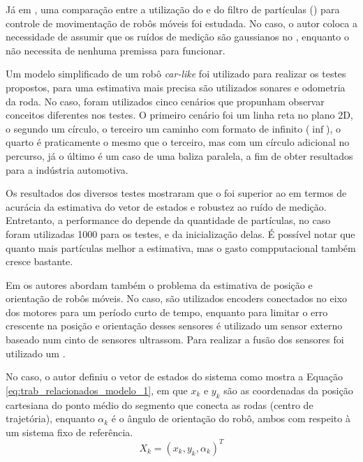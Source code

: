 \documentclass[acronym, symbols]{fei}
\begin{document}
	Já em \cite{rigatos2010extended}, uma comparação entre a utilização do  e do filtro de partículas () para controle de movimentação de robôs móveis foi estudada. No caso, o autor coloca a necessidade de assumir que os ruídos de medição são gaussianos no , enquanto o  não necessita de nenhuma premissa para funcionar.
	
	Um modelo simplificado de um robô \textit{car-like} foi utilizado para realizar os testes propostos, para uma estimativa mais precisa são utilizados sonares e odometria da roda. No caso, foram utilizados cinco cenários que propunham observar conceitos diferentes nos testes. O primeiro cenário foi um linha reta no plano 2D, o segundo um círculo, o terceiro um caminho com formato de infinito ($\inf$), o quarto é praticamente o mesmo que o terceiro, mas com um círculo adicional no percurso, já o último é um caso de uma baliza paralela, a fim de obter resultados para a indústria automotiva.
	
	Os resultados dos diversos testes mostraram que o  foi superior ao  em termos de acurácia da estimativa do vetor de estados e robustez ao ruído de medição. Entretanto, a performance do  depende da quantidade de partículas, no caso foram utilizadas 1000 para os testes, e da inicialização delas. É possível notar que quanto mais partículas melhor a estimativa, mas o gasto compputacional também cresce bastante.
	
	Em \textcite{santini1997trajectory} os autores abordam também o problema da estimativa de posição e orientação de robôs móveis. No caso, são utilizados encoders conectados no eixo dos motores para um período curto de tempo, enquanto para limitar o erro crescente na posição e orientação desses sensores é utilizado um sensor externo baseado num cinto de sensores ultrassom. Para realizar a fusão dos sensores foi utilizado um .
	
	No caso, o autor definiu o vetor de estados do sistema como mostra a Equação \eqref{eq:trab_relacionados_modelo_1}, em que $x_k$ e $y_k$ são as coordenadas da posição cartesiana do ponto médio do segmento que conecta as rodas (centro de trajetória), enquanto $\alpha_k$ é o ângulo de orientação do robô, ambos com respeito à um sistema fixo de referência.
	\begin{equation} \label{eq:trab_relacionados_modelo_1}
	X_k = (x_k, y_k, \alpha_k)^T
	\end{equation}
	
\end{document}
